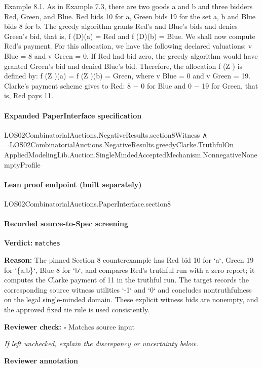 \documentclass[10pt]{article}
\newcommand{\reviewerbox}{%
  \par\noindent\fbox{\parbox{0.96\linewidth}{\rule{0pt}{0.38in}}}\par
}
\newcommand{\reviewmatch}[1]{%
  \par\noindent\textbf{Reviewer check:} $\square$\; #1\par
  \noindent\emph{If left unchecked, explain the discrepancy or uncertainty below.}\par
}
\begin{document}
\begin{ReviewVerbatim}
Example 8.1. As in Example 7.3, there are two goods a and b and three bidders
Red, Green, and Blue. Red bids 10 for a, Green bids 19 for the set {a, b} and Blue
bids 8 for b. The greedy algorithm grants Red’s and Blue’s bids and denies Green’s
bid, that is, f (D)(a) = Red and f (D)(b) = Blue. We shall now compute Red’s
payment. For this allocation, we have the following declared valuations: v Blue = 8
and v Green = 0. If Red had bid zero, the greedy algorithm would have granted
Green’s bid and denied Blue’s bid. Therefore, the allocation f (Z ) is defined by:
f (Z )(a) = f (Z )(b) = Green, where v Blue = 0 and v Green = 19. Clarke’s payment
scheme gives to Red: 8 − 0 for Blue and 0 − 19 for Green, that is, Red pays 11.
\end{ReviewVerbatim}



\paragraph{Expanded PaperInterface specification}
\begin{ReviewVerbatim}
LOS02CombinatorialAuctions.NegativeResults.section8Witness ∧
  ¬LOS02CombinatorialAuctions.NegativeResults.greedyClarke.TruthfulOn
      AppliedModelingLib.Auction.SingleMindedAcceptedMechanism.NonnegativeNonemptyProfile
\end{ReviewVerbatim}



\paragraph{Lean proof endpoint (built separately)}\begin{ReviewVerbatim}
LOS02CombinatorialAuctions.PaperInterface.section8
\end{ReviewVerbatim}

\paragraph{Recorded source-to-Spec screening}
\textbf{Verdict:} \texttt{matches}
\\
{\raggedright
\textbf{Reason:} The pinned Section 8 counterexample has Red bid 10 for `a`, Green 19 for `\{a,b\}`, Blue 8 for `b`, and compares Red's truthful run with a zero report;\allowbreak{} it computes the Clarke payment of 11 in the truthful run.\allowbreak{} The target records the corresponding source witness utilities `-\allowbreak{}1` and `0` and concludes nontruthfulness on the legal single-\allowbreak{}minded domain.\allowbreak{} These explicit witness bids are nonempty, and the approved fixed tie rule is used consistently.\allowbreak{}
\par}
\reviewmatch{Matches source input}
\noindent\textbf{Reviewer annotation}\par
\reviewerbox
\clearpage
\hypertarget{source-claim-6ba5971f67501854}{}
\end{document}
